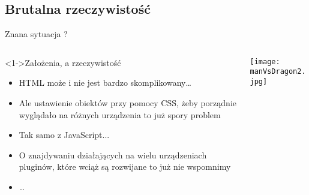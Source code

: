 \documentclass{beamer}
\begin{document}
\subsection{Brutalna rzeczywistość}
\begin{frame}{Znana sytuacja ?}
     \begin{columns}[T] %
     
          \begin{column}[T]{7cm} %
     \begin{block}<1->{Założenia, a rzeczywistość}
	\begin{itemize}
    \item<1-> HTML może i nie jest bardzo skomplikowany\dots
    \item<2-> Ale ustawienie obiektów przy pomocy CSS, żeby porządnie wyglądało na różnych urządzenia to już spory problem
    \item<3-> Tak samo z JavaScript...
    \item<4-> O znajdywaniu działających na wielu urządzeniach pluginów, które wciąż są rozwijane to już nie wspomnimy
    \item<5->\dots
    \end{itemize}
\end{block}
     \end{column}
      \begin{column}[T]{5cm} %
          \texttt{[image: manVsDragon2.jpg]}
     \end{column}
     \end{columns}
\end{frame}
\end{document}

